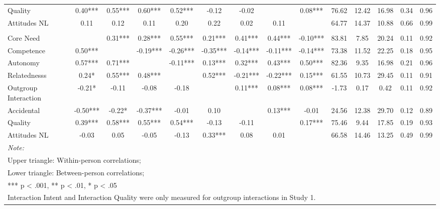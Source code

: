 \begin{table}
\begin{minipage}[t][\textheight][t]{\textwidth}
{\begin{tabular}[t]{lccccccccccccc}
\hspace{1em}Quality & 0.40*** & 0.55*** & 0.60*** & 0.52*** & -0.12 & -0.02 &  & 0.08*** & 76.62 & 12.42 & 16.98 & 0.34 & 0.96\\
\hspace{1em}Attitudes NL & 0.11 & 0.12 & 0.11 & 0.20 & 0.22 & 0.02 & 0.11 &  & 64.77 & 14.37 & 10.88 & 0.66 & 0.99\\
\addlinespace[0.3em]
\multicolumn{14}{l}{\textbf{Across Studies}}\\
\hspace{1em}Core Need &  & 0.31*** & 0.28*** & 0.55*** & 0.21*** & 0.41*** & 0.44*** & -0.10*** & 83.81 & 7.85 & 20.24 & 0.11 & 0.92\\
\hspace{1em}Competence & 0.50*** &  & -0.19*** & -0.26*** & -0.35*** & -0.14*** & -0.11*** & -0.14*** & 73.38 & 11.52 & 22.25 & 0.18 & 0.95\\
\hspace{1em}Autonomy & 0.57*** & 0.71*** &  & -0.11*** & 0.13*** & 0.32*** & 0.43*** & 0.50*** & 82.36 & 9.35 & 16.98 & 0.21 & 0.96\\
\hspace{1em}Relatednesss & 0.24* & 0.55*** & 0.48*** &  & 0.52*** & -0.21*** & -0.22*** & 0.15*** & 61.55 & 10.73 & 29.45 & 0.11 & 0.91\\
\hspace{1em}Outgroup Interaction & -0.21* & -0.11 & -0.08 & -0.18 &  & 0.11*** & 0.08*** & 0.08*** & -1.73 & 0.17 & 0.42 & 0.11 & 0.92\\
\hspace{1em}Accidental & -0.50*** & -0.22* & -0.37*** & -0.01 & 0.10 &  & 0.13*** & -0.01 & 24.56 & 12.38 & 29.70 & 0.12 & 0.89\\
\hspace{1em}Quality & 0.39*** & 0.58*** & 0.55*** & 0.54*** & -0.13 & -0.11 &  & 0.17*** & 75.46 & 9.44 & 17.85 & 0.19 & 0.93\\
\hspace{1em}Attitudes NL & -0.03 & 0.05 & -0.05 & -0.13 & 0.33*** & 0.08 & 0.01 &  & 66.58 & 14.46 & 13.25 & 0.49 & 0.99\\
\bottomrule
\multicolumn{14}{l}{\rule{0pt}{1em}\textit{Note: }}\\
\multicolumn{14}{l}{\rule{0pt}{1em}Upper triangle: Within-person correlations;}\\
\multicolumn{14}{l}{\rule{0pt}{1em}Lower triangle: Between-person correlations;}\\
\multicolumn{14}{l}{\rule{0pt}{1em}*** p < .001, ** p < .01,  * p < .05}\\
\multicolumn{14}{l}{\rule{0pt}{1em}Interaction Intent and Interaction Quality were only measured for outgroup interactions in Study 1.}\\
\end{tabular}}
\end{minipage}
\end{table}
